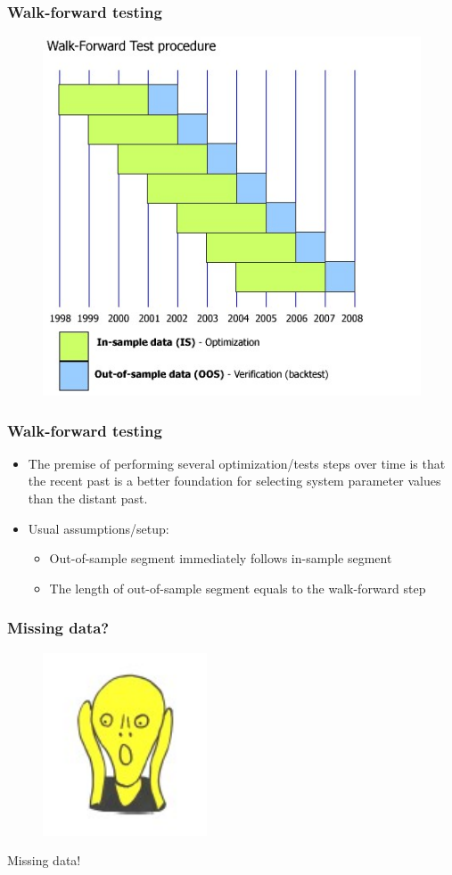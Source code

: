 \documentclass{beamer}
\begin{document}
\begin{frame}
\frametitle{Walk-forward testing}

\begin{center}
\begin{figure}
\includegraphics[width=0.6\linewidth]{IMG/walkfwd2.jpg}
\end{figure}
\end{center}

\end{frame}


\begin{frame}
\frametitle{Walk-forward testing}

\begin{itemize}
\item The premise of performing several optimization/tests steps over time is that the recent past is a better foundation for selecting system parameter values than the distant past. 
\bigskip
\item Usual assumptions/setup:
\medskip
\begin{itemize}
\item Out-of-sample segment immediately follows in-sample segment
\medskip
\item The length of out-of-sample segment equals to the walk-forward step
\end{itemize}
\end{itemize}

\end{frame}


\begin{frame}
\frametitle{Missing data?}
\begin{figure}
\includegraphics[width=0.15\linewidth]{IMG/Complex_topic.pdf}
\end{figure}

\begin{center}
Missing data! 
\end{center}

\end{frame}
\end{document}
